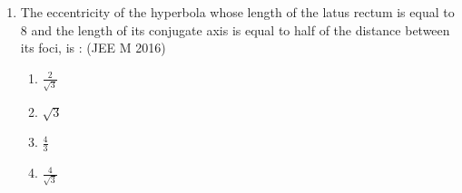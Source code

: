 \documentclass[journal,12pt,twocolumn]{IEEEtran}
\theoremstyle{remark}
\begin{document}
\begin{enumerate}
    \item The eccentricity of the hyperbola whose length of the latus rectum is equal to $8$ and the length of its conjugate axis is equal to half of the distance between its foci, is :
    \hfill(JEE M 2016)
    \begin{enumerate}
    \item$\frac{2}{\sqrt{3}}$
    \item$\sqrt{3}$
    \item$\frac{4}{3}$
    \item$\frac{4}{\sqrt{3}}$
    \end{enumerate}

\end{enumerate}
\end{document}
